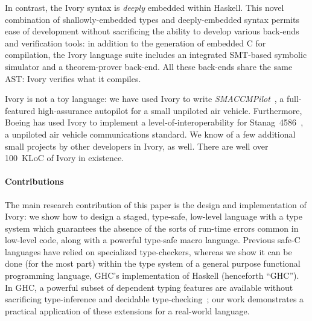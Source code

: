In contrast, the Ivory syntax is \emph{deeply} embedded within
Haskell. This novel combination of shallowly-embedded types and
deeply-embedded syntax permits ease of development without sacrificing
the ability to develop various back-ends and verification tools: in
addition to the generation of embedded C for compilation, the Ivory
language suite includes an integrated SMT-based symbolic simulator and
a theorem-prover back-end.  All these back-ends share the same AST:
Ivory verifies what it compiles.


Ivory is not a toy language: we have used Ivory to write
\emph{SMACCMPilot}~\cite{smaccm}, a full-featured high-assurance
autopilot for a small unpiloted air vehicle.  Furthermore, Boeing has
used Ivory to implement a level-of-interoperability for
Stanag~4586~\cite{stanag}, a unpiloted air vehicle communications
standard. We know of a few additional small projects by other
developers in Ivory, as well.  There are well over 100~KLoC of Ivory in existence.



\paragraph{Contributions}
The main research contribution of this paper is the design and implementation of
Ivory: we show how to design a staged, type-safe, low-level language with a type
system which guarantees the absence of the sorts of run-time errors common in
low-level code, along with a powerful type-safe macro language. Previous safe-C
languages have relied on specialized type-checkers, whereas we show it can be
done (for the most part) within the type system of a general purpose functional
programming language, GHC's implementation of Haskell (henceforth ``GHC''). In
GHC, a powerful subset of dependent typing features are available without
sacrificing type-inference and decidable type-checking~\cite{dephaskell}; our
work demonstrates a practical application of these extensions for a real-world
language.


